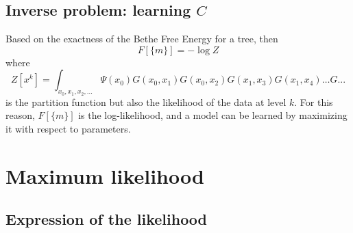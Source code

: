 \documentclass[10pt]{article}
\begin{document}
\subsection{Inverse problem: learning $C$}

Based on the exactness of the Bethe Free Energy for a tree, then 
\[ F[\{m\}] = - \log Z
\]
where 
\[ Z[x^k] = \int_{x_0,x_1,x_2,\ldots} \Psi(x_0) G(x_0,x_1) G(x_0,x_2) G(x_1,x_3) G(x_1,x_4) \ldots G...
\]
is the partition function but also the likelihood of the data at level $k$. For this reason, $F[\{m\}]$ is the log-likelihood, and a model can be
learned by maximizing it with respect to parameters. 

\section{Maximum likelihood} %
\label{sec:maximum_likelihood}

\subsection{Expression of the likelihood} %
\label{sub:expression_of_the_likelihood}
\end{document}
